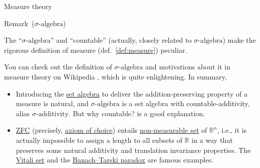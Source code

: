 \documentclass[utf-8, 10pt, aspectratio=1610]{beamer}
\begin{document}
\begin{frame}[allowframebreaks]{Measure theory}
	\begin{block}{Remark\ (\(\sigma \text{-algebra} \))}
		\par The ``\(\sigma \text{-algebra} \)'' and ``countable'' (actually, closely related to \(\sigma \text{-algebra} \)) make the rigorous definition of measure (def.~\ref{def:measure}) peculiar.
		\par You can check out the definition of \(\sigma \text{-algebra}\) and motivations about it in measure theory on Wikipedia \cite{enwiki:1173641705} , which is quite enlightening. In summary,
		\begin{itemize}
			\item Introducing the \href{https://en.wikipedia.org/wiki/Field_of_sets}{set algebra} to deliver the addition-preserving property of a measure is natural, and \(\sigma \text{-algebra} \) is a set algebra with countable-additivity, alias \(\sigma \text{-additivity} \). But why countable? \cite{566154}  is a good explanation.
			\item \href{https://en.wikipedia.org/wiki/Zermelo-Fraenkel_set_theory}{ZFC} (precisely, \href{https://en.wikipedia.org/wiki/Axiom_of_choice}{axiom of choice}) entails \href{https://en.wikipedia.org/wiki/Non-measurable_set}{non-measurable set} of \(\mathbb{R}^n\), i.e., it is actually impossible to assign a length to all subsets of \(\mathbb{R}\) in a way that preserves some natural additivity and translation invariance properties.   The \href{https://en.wikipedia.org/wiki/Vitali_set}{Vitali set} and the \href{https://en.wikipedia.org/wiki/Banach-Tarski_paradox}{Banach–Tarski paradox} are famous examples.
		\end{itemize}
	\end{block}

	\vspace*{\fill}
	\framebreak
	\vspace*{\fill}


\end{frame}
\end{document}
